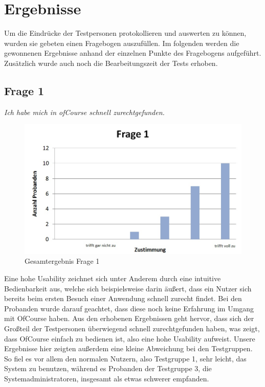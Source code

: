 \section{Ergebnisse}
Um die Eindrücke der Testpersonen protokollieren und auswerten zu können, wurden sie gebeten einen Fragebogen auszufüllen.
Im folgenden werden die gewonnenen Ergebnisse anhand der einzelnen Punkte des Fragebogens aufgeführt. Zusätzlich
wurde auch noch die Bearbeitungszeit der Tests erhoben.

\subsection{Frage 1}
\begin{center}
	{\it Ich habe mich in ofCourse schnell zurechtgefunden.}
\end{center}
\begin{figure}[h]
\centering
\includegraphics[width=0.7\linewidth]{img/Frage1}
\caption{Gesamtergebnis Frage 1}
\label{fig:Frage1}
\end{figure}
Eine hohe Usability zeichnet sich unter Anderem durch eine intuitive Bedienbarkeit aus, welche sich beispielsweise darin äußert, dass ein Nutzer sich bereits beim ersten Besuch einer Anwendung schnell zurecht findet. Bei den Probanden wurde darauf geachtet, dass diese noch keine Erfahrung im Umgang mit OfCourse haben. Aus den erhobenen Ergebnissen geht hervor, dass sich der Großteil der Testpersonen überwiegend schnell zurechtgefunden haben, was zeigt, dass OfCourse einfach zu bedienen ist, also eine hohe Usability aufweist. Unsere Ergebnisse hier zeigten außerdem eine kleine Abweichung bei den Testgruppen. So fiel es vor allem den normalen Nutzern, also Testgruppe 1, sehr leicht, das System zu benutzen, während es Probanden der Testgruppe 3, die Systemadministratoren, insgesamt als etwas schwerer empfanden.
\newpage
